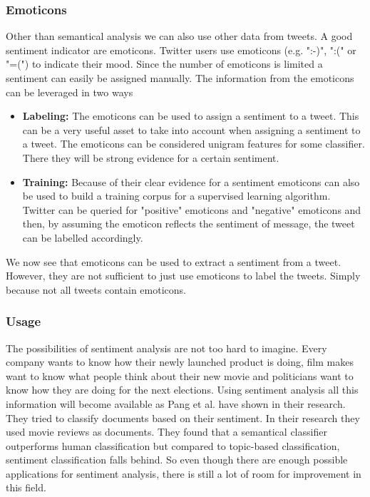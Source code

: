 \documentclass{article}
\begin{document}
\subsubsection*{Emoticons}
Other than semantical analysis we can also use other data from tweets. A good sentiment indicator are emoticons. Twitter users use emoticons (e.g. ":-)", ":(" or "=(") to indicate their mood.\cite{twitterSentiment} Since the number of emoticons is limited a sentiment can easily be assigned manually. The information from the emoticons can be leveraged in two ways
\begin{itemize}
\item \textbf{Labeling:} The emoticons can be used to assign a sentiment to a tweet. This can be a very useful asset to take into account when assigning a sentiment to a tweet. The emoticons can be considered unigram features for some classifier. There they will be strong evidence for a certain sentiment.
\item \textbf{Training:} Because of their clear evidence for a sentiment emoticons can also be used to build a training corpus for a supervised learning algorithm. Twitter can be queried for "positive" emoticons and "negative" emoticons and then, by assuming the emoticon reflects the sentiment of message, the tweet can be labelled accordingly.\cite{moodLens} 
\end{itemize}
We now see that emoticons can be used to extract a sentiment from a tweet. However, they are not sufficient to just use emoticons to label the tweets. Simply because not all tweets contain emoticons.
\subsubsection*{Usage}
The possibilities of sentiment analysis are not too hard to imagine. Every company wants to know how their newly launched product is doing, film makes want to know what people think about their new movie and politicians want to know how they are doing for the next elections. Using sentiment analysis all this information will become available as Pang et al. \cite{machineLearning} have shown in their research. They tried to classify documents based on their sentiment. In their research they used movie reviews as documents. They found that a semantical classifier outperforms human classification but compared to topic-based classification, sentiment classification falls behind. So even though there are enough possible applications for sentiment analysis, there is still a lot of room for improvement in this field.
\end{document}
